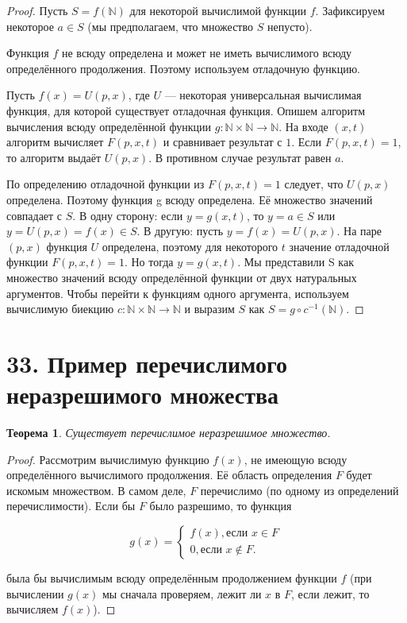 \documentclass[a4paper, 12pt]{article}
\newtheorem*{theorem}{Теорема}
\newcommand{\N}{\mathbb{N}}
\begin{document}
        \begin{proof}
            Пусть $S = f(\N)$ для некоторой вычислимой функции $f$. Зафиксируем некоторое $a \in S$ (мы предполагаем, что множество $S$ непусто). 
            
            Функция $f$ не всюду определена и может не иметь вычислимого всюду определённого продолжения. Поэтому используем отладочную функцию. 
            
            Пусть $f(x) = U(p, x)$, где $U$ — некоторая универсальная вычислимая функция, для которой существует отладочная функция. Опишем алгоритм вычисления всюду определённой функции $g : \mathbb N \times \mathbb N \to \mathbb N$. На входе $(x, t)$ алгоритм вычисляет $F(p, x, t)$ и сравнивает результат с $1$. Если $F(p, x, t) = 1$, то алгоритм выдаёт $U(p, x)$. В противном случае результат равен $a$. 
            
            По определению отладочной функции из $F(p, x, t) = 1$ следует, что $U(p, x)$ определена. Поэтому функция g всюду определена. Её множество значений совпадает с $S$. В одну сторону: если $y = g(x, t)$, то $y = a \in S$ или $y = U(p, x) = f(x) \in S$. В другую: пусть $y = f(x) = U(p, x)$. На паре $(p, x)$ функция $U$ определена, поэтому для некоторого $t$ значение отладочной функции $F(p, x, t) = 1$. Но тогда $y = g(x, t)$. Мы представили S как множество значений всюду определённой функции от двух натуральных аргументов. Чтобы перейти к функциям одного аргумента, используем вычислимую биекцию $c : \mathbb N \times \mathbb N \to \mathbb N$ и выразим $S$ как $S = g \circ c^{-1}(\mathbb N)$.
        
        \end{proof}

\section*{33. Пример перечислимого неразрешимого множества}

\begin{theorem}
    Существует перечислимое неразрешимое множество.
\end{theorem}

\begin{proof}
    Рассмотрим вычислимую функцию $f(x)$, не имеющую всюду определённого вычислимого продолжения. Её область определения $F$ будет искомым множеством. В самом деле, $F$ перечислимо (по одному из определений перечислимости). Если бы $F$ было разрешимо, то функция
    
    \[
        g(x) =
        \begin{cases}
            f(x), \text{если $x \in F$} \\
            0, \text{если  $x \notin F$}.
        \end{cases}
    \]
    
    была бы вычислимым всюду определённым продолжением функции $f$ (при вычислении $g(x)$ мы сначала проверяем, лежит ли $x$ в $F$, если лежит, то вычисляем $f(x)$).
\end{proof}
\end{document}
